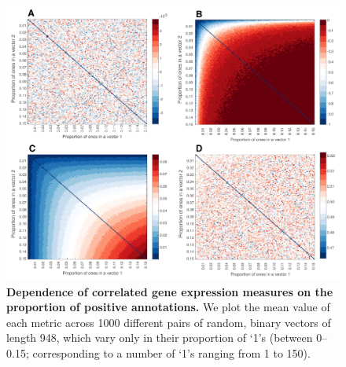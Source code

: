 \documentclass[10pt,letterpaper]{article}
\begin{document}
{\clearpage




\begin{figure}[h]
\centering
    \includegraphics[width=1\textwidth]{CoexpressionMeasures.pdf}
\caption{
\label{fig:S_propOnes}
\textbf{Dependence of correlated gene expression measures on the proportion of positive annotations.}
We plot the mean value of each metric across 1000 different pairs of random, binary vectors of length 948, which vary only in their proportion of `1's (between 0--0.15; corresponding to a number of `1's ranging from 1 to 150).
}
\end{figure}}
\end{document}
